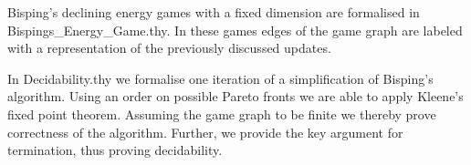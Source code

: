 Bisping's declining energy games with a fixed dimension are formalised in Bispings\_Energy\_Game.thy. In these games edges of the game graph are labeled with a representation of the previously discussed updates. 

In Decidability.thy we formalise one iteration of a simplification of Bisping's algorithm. Using an order on possible Pareto fronts we are able to apply Kleene's fixed point theorem. Assuming the game graph to be finite we thereby prove correctness of the algorithm. Further, we provide the key argument for termination, thus proving decidability. 

